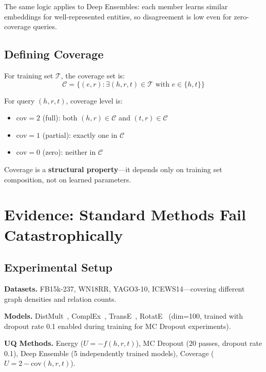 \documentclass{article}
\begin{document}
The same logic applies to Deep Ensembles: each member learns similar embeddings for well-represented entities, so disagreement is low even for zero-coverage queries.

\subsection{Defining Coverage}

For training set $\mathcal{T}$, the coverage set is:
\[
\mathcal{C} = \{(e, r) : \exists (h, r, t) \in \mathcal{T} \text{ with } e \in \{h, t\}\}
\]

For query $(h, r, t)$, coverage level is:
\begin{itemize}
    \item $\text{cov} = 2$ (full): both $(h, r) \in \mathcal{C}$ and $(t, r) \in \mathcal{C}$
    \item $\text{cov} = 1$ (partial): exactly one in $\mathcal{C}$
    \item $\text{cov} = 0$ (zero): neither in $\mathcal{C}$
\end{itemize}

Coverage is a \textbf{structural property}---it depends only on training set composition, not on learned parameters.



\section{Evidence: Standard Methods Fail Catastrophically}
\label{sec:evidence}

\subsection{Experimental Setup}

\textbf{Datasets.} FB15k-237, WN18RR, YAGO3-10, ICEWS14---covering different graph densities and relation counts.

\textbf{Models.} DistMult~\citep{yang2015embedding}, ComplEx~\citep{trouillon2016complex}, TransE~\citep{bordes2013translating}, RotatE~\citep{sun2019rotate} (dim=100, trained with dropout rate 0.1 enabled during training for MC Dropout experiments).

\textbf{UQ Methods.} Energy ($U = -f(h,r,t)$), MC Dropout (20 passes, dropout rate 0.1), Deep Ensemble (5 independently trained models), Coverage ($U = 2 - \text{cov}(h,r,t)$).
\end{document}
